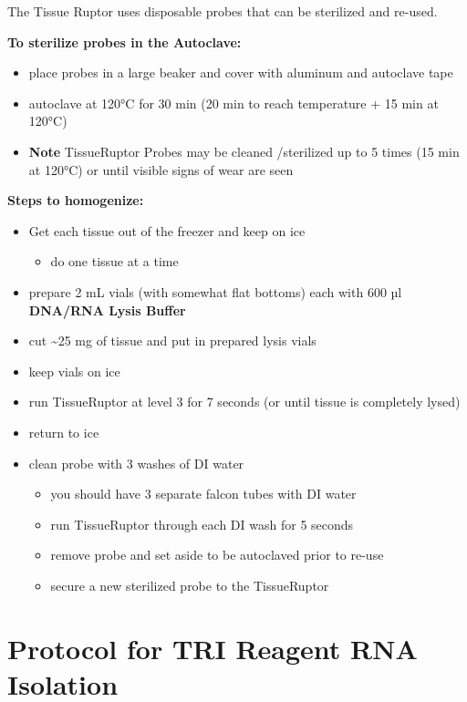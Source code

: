 \documentclass[
  letterpaper,
  DIV=11,
  numbers=noendperiod]{scrreprt}
\providecommand{\tightlist}{%
  \setlength{\itemsep}{0pt}\setlength{\parskip}{0pt}}\usepackage{longtable,booktabs,array}
\begin{document}
The Tissue Ruptor uses disposable probes that can be sterilized and
re-used.

\textbf{To sterilize probes in the Autoclave:}

\begin{itemize}
\item
  place probes in a large beaker and cover with aluminum and autoclave
  tape
\item
  autoclave at 120°C for 30 min (20 min to reach temperature + 15 min at
  120°C)
\item
  \textbf{Note} TissueRuptor Probes may be cleaned /sterilized up to 5
  times (15 min at 120°C) or until visible signs of wear are seen
\end{itemize}

\textbf{Steps to homogenize:}

\begin{itemize}
\item
  Get each tissue out of the freezer and keep on ice

  \begin{itemize}
  \tightlist
  \item
    do one tissue at a time
  \end{itemize}
\item
  prepare 2 mL vials (with somewhat flat bottoms) each with 600 µl
  \textbf{DNA/RNA Lysis Buffer}
\item
  cut \textasciitilde25 mg of tissue and put in prepared lysis vials
\item
  keep vials on ice
\item
  run TissueRuptor at level 3 for 7 seconds (or until tissue is
  completely lysed)
\item
  return to ice
\item
  clean probe with 3 washes of DI water

  \begin{itemize}
  \item
    you should have 3 separate falcon tubes with DI water
  \item
    run TissueRuptor through each DI wash for 5 seconds
  \item
    remove probe and set aside to be autoclaved prior to re-use
  \item
    secure a new sterilized probe to the TissueRuptor
  \end{itemize}
\end{itemize}

\hypertarget{protocol-for-tri-reagent-rna-isolation}{%
\section*{\texorpdfstring{\textbf{Protocol for TRI Reagent RNA
Isolation}}{Protocol for TRI Reagent RNA Isolation}}\label{protocol-for-tri-reagent-rna-isolation}}
\end{document}
